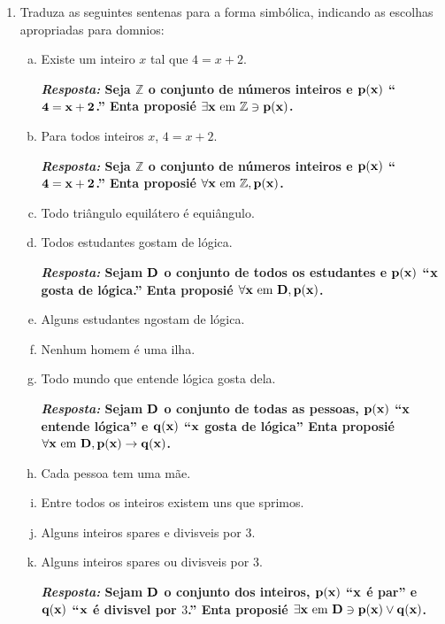 \begin{enumerate}[{\bf 1.}]
\item Traduza as seguintes senten\cc as para a forma simb\'olica, indicando as escolhas apropriadas para dom\ih nios:
\begin{enumerate}[a)]
\item Existe um inteiro $x$ tal que $4=x+2$.

{\bf{\it Resposta:} Seja $\mathbb{Z}$ o conjunto de n\'umeros inteiros e ${\bf p(x)}$ ``${\bf 4=x+2}$.'' Ent\ao a proposi\cao \'e ${\bf \exists x \textrm{ em } \mathbb{Z} \ni p(x)}$.}

\item Para todos inteiros $x$, $4=x+2$.

{\bf{\it Resposta:} Seja $\mathbb{Z}$ o conjunto de n\'umeros inteiros e ${\bf p(x)}$ ``${\bf 4=x+2}$.'' Ent\ao a proposi\cao \'e ${\bf \forall x \textrm{ em } \mathbb{Z}, p(x)}$.}

\item Todo tri\^angulo equil\'atero \'e equi\^angulo.
\item Todos estudantes gostam de l\'ogica.

{\bf{\it Resposta:} Sejam ${\bf D}$ o conjunto de todos os estudantes e ${\bf p(x})$ ``${\bf x}$ gosta de l\'ogica.'' Ent\ao a proposi\cao \'e ${\bf \forall x \textrm{ em } D, p(x)}$.}

\item Alguns estudantes n\ao gostam de l\'ogica.
\item Nenhum homem \'e uma ilha.
\item Todo mundo que entende l\'ogica gosta dela.

{\bf{\it Resposta:} Sejam ${\bf D}$ o conjunto de todas as pessoas, ${\bf p(x)}$ ``${\bf x}$ entende l\'ogica'' e ${\bf q(x)}$ ``${\bf x}$ gosta de l\'ogica'' Ent\ao a proposi\cao \'e ${\bf \forall x \textrm{ em } D, p(x)\to q(x)}$.}

\item Cada pessoa tem uma m\~ae.
\item Entre todos os inteiros existem uns que s\ao primos.
\item Alguns inteiros s\ao pares e divis\ih veis por 3.
\item Alguns inteiros s\ao pares ou divis\ih veis por 3. 

{\bf{\it Resposta:} Sejam ${\bf D}$ o conjunto dos inteiros, ${\bf p(x)}$ ``${\bf x}$ \'e par'' e ${\bf q(x)}$ ``${\bf x}$ \'e divis\ih vel por $3$.'' Ent\ao a proposi\cao \'e ${\bf \exists x \textrm{ em } D \ni p(x)\vee q(x)}$.}


\end{enumerate}
\end{enumerate}
